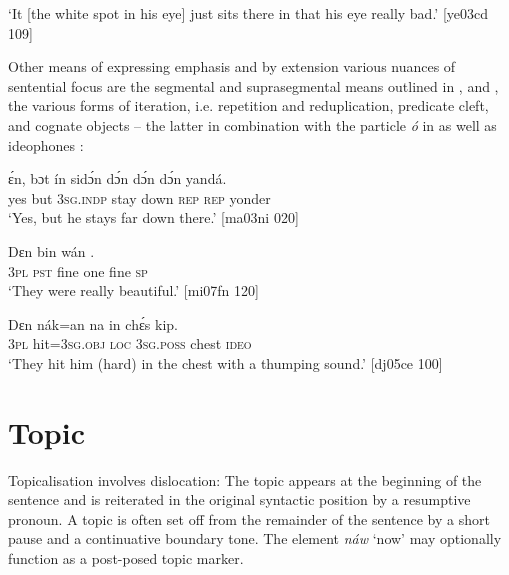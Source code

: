 \glt ‘It [the white spot in his eye] just sits there in that his eye really bad.’ [ye03cd 109]
\z

Other means of expressing emphasis and by extension various nuances of sentential focus are the segmental and suprasegmental means outlined in ,  and , the various forms of iteration, i.e. repetition  and reduplication, predicate cleft, and cognate objects – the latter in combination with the particle \textit{ó} in  as well as ideophones :


\ea%
    \label{ex:key:745}
    \gll ɛ́n,  bɔt  ín    sidɔ́n  dɔ́n    dɔ́n     dɔ́n    yandá.\\
yes  but  \textsc{3sg.indp}  stay    down  \textsc{rep}    \textsc{rep}    yonder\\

\glt ‘Yes, but he stays far down there.’ [ma03ni 020]
\z


\ea%
    \label{ex:key:746}
    \gll Dɛn  bin    wán      .\\
\textsc{3pl}  \textsc{pst}  fine    one    fine    \textsc{sp}\\

\glt ‘They were really beautiful.’ [mi07fn 120]
\z


\ea%
    \label{ex:key:747}
    \gll Dɛn  nák=an    na  in    chɛ́s    kip.\\
\textsc{3pl}  hit=\textsc{3sg.obj}  \textsc{loc}  \textsc{3sg.poss}  chest  \textsc{ideo}\\

\glt ‘They hit him (hard) in the chest with a thumping sound.’ [dj05ce 100]
\z

\section{Topic}\label{sec:7.5}

Topicalisation involves dislocation: The topic appears at the beginning of the sentence and is reiterated in the original syntactic position by a resumptive pronoun. A topic is often set off from the remainder of the sentence by a short pause and a continuative boundary tone. The element \textit{náw} ‘now’ may optionally function as a post-posed topic marker.

